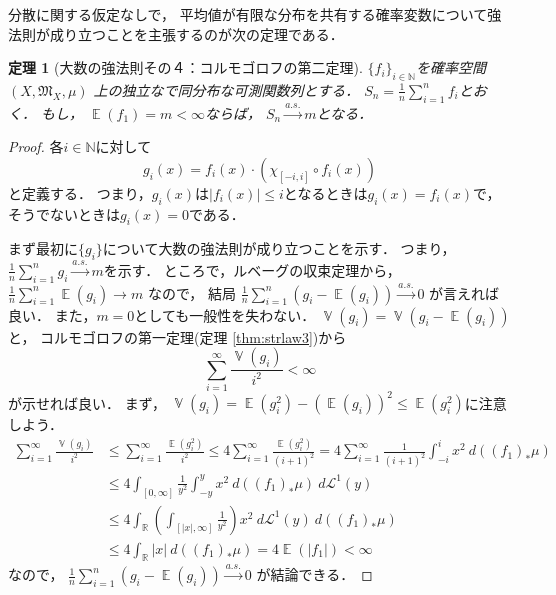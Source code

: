 \documentclass[leqno, a4paper, 12pt]{jsarticle}
\newtheorem{thm}{定理}
\newcommand{\nn}{\mathbb{N}}
\newcommand{\rr}{\mathbb{R}}
\DeclareMathOperator{\mean}{\mathbb{E}}
\DeclareMathOperator{\varian}{\mathbb{V}}
\begin{document}
分散に関する仮定なしで，
平均値が有限な分布を共有する確率変数について強法則が成り立つことを主張するのが次の定理である．
\begin{thm}[大数の強法則その４：コルモゴロフの第二定理]
\label{thm:strlaw4}
$\{f_i\}_{i\in \nn}$を確率空間
$(X, \mathfrak{M}_X, \mu)$
上の独立なで同分布な可測関数列とする．
$S_{n}=\frac{1}{n}\sum_{i=1}^nf_{i}$とおく．
もし，
$\mean(f_1)=m<\infty$ならば，
$S_n\xrightarrow{a. s. }m$となる．
\end{thm}
\begin{proof}
各$i\in \nn$に対して
\[
g_i(x)=f_i(x)\cdot \left(\chi_{[-i, i]}\circ f_{i}(x)\right)
\]
と定義する．
つまり，$g_{i}(x)$は$|f_{i}(x)|\le i$となるときは$g_{i}(x)=f_{i}(x)$で，そうでないときは$g_{i}(x)=0$である．

まず最初に$\{g_i\}$について大数の強法則が成り立つことを示す．
つまり，
$\frac{1}{n}\sum_{i=1}^ng_{i}\xrightarrow{a. s.}m$を示す．
ところで，ルベーグの収束定理から，
$\frac{1}{n}\sum_{i=1}^n\mean(g_{i})\to m$
なので，
結局
$\frac{1}{n}\sum_{i=1}^n(g_i-\mean(g_i))\xrightarrow{a. s. }0$
が言えれば良い．
また，$m=0$としても一般性を失わない．
$\varian(g_{i})=\varian(g_{i}-\mean(g_{i}))$と，
コルモゴロフの第一定理(定理 \ref{thm:strlaw3})から
\[
\sum_{i=1}^{\infty}\frac{\varian(g_i)}{i^2}<\infty
\]
が示せれば良い．
まず，
$\varian(g_{i})=\mean(g_{i}^{2})-(\mean(g_{i}))^{2}\le
\mean(g_{i}^{2})$に注意しよう．
\begin{align*}
\sum_{i=1}^{\infty}\frac{\varian(g_i)}{i^2}
&\le 
\sum_{i=1}^{\infty}\frac{\mean(g_i^2)}{i^2}
\le 
4\sum_{i=1}^{\infty}\frac{\mean(g_i^2)}{(i+1)^2}
=
4\sum_{i=1}^{\infty}\frac{1}{(i+1)^2}\int_{-i}^{i}x^2\ d((f_1)_{*}\mu)\\
&\le 
4\int_{[0, \infty]}\frac{1}{y^2}\int_{-y}^{y}x^2\ 
d((f_1)_{*}\mu)\ d\mathcal{L}^1(y)\\
&\le 
4\int_{\rr}\left(\int_{[|x|, \infty]}\frac{1}{y^2}\right)x^2\ d\mathcal{L}^1(y)
\ d((f_1)_{*}\mu)\\
&\le 
4\int_{\rr}|x|\ d((f_1)_{*}\mu)=4\mean(|f_1|)<\infty
\end{align*}
なので，
$\frac{1}{n}\sum_{i=1}^n(g_i-\mean(g_i))\xrightarrow{a. s. }0$
が結論できる．


\end{proof}
\end{document}
